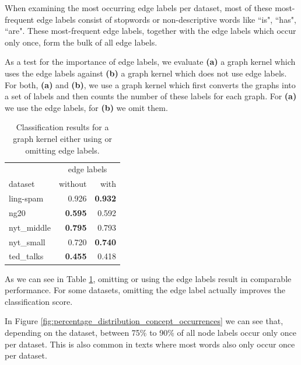 When examining the most occurring edge labels per dataset, most of these most-frequent edge labels consist of stopwords or non-descriptive words like ``is", ``has", ``are".
These most-frequent edge labels, together with the edge labels which occur only once, form the bulk of all edge labels.

As a test for the importance of edge labels, we evaluate \textbf{(a)} a graph kernel which uses the edge labels against \textbf{(b)} a graph kernel which does not use edge labels.
For both, \textbf{(a)} and \textbf{(b)}, we use a graph kernel which first converts the graphs into a set of labels and then counts the number of these labels for each graph.
For \textbf{(a)} we use the edge labels, for \textbf{(b)} we omit them.

\begin{table}[htb!]
	\centering
\begin{tabular}{lrr}
	{} & \multicolumn{2}{c}{edge labels} \\
	dataset & without & with \\
	\midrule
	ling-spam  & 0.926 & \textbf{0.932} \\
	ng20       & \textbf{0.595} & 0.592 \\
	nyt\_middle & \textbf{0.795} & 0.793 \\
	nyt\_small  & 0.720 &\textbf{ 0.740} \\
	ted\_talks  & \textbf{0.455} & 0.418 \\
	\bottomrule
\end{tabular}
\caption[Results: Graph Kernel with and without edge labels]{Classification results for a graph kernel either using or omitting edge labels.}\label{table:edge_label_classification}
\end{table}

As we can see in Table \ref{table:edge_label_classification}, omitting or using the edge labels result in comparable performance.
For some datasets, omitting the edge label actually improves the classification score.


In Figure \ref{fig:percentage_distribution_concept_occurrences} we can see that, depending on the dataset, between 75\% to 90\% of all node labels occur only once per dataset.
This is also common in texts where most words also only occur once per dataset.
 
